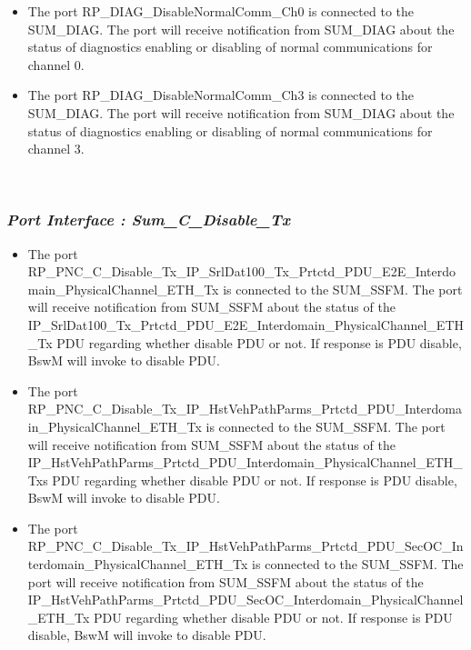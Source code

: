 \begin{itemize}
	\item The port RP_DIAG_DisableNormalComm_Ch0 is connected to the SUM_DIAG. The port will receive notification from SUM_DIAG about the status
    of diagnostics enabling or disabling of normal communications for channel 0.
\end{itemize}



\begin{itemize}
	\item The port RP_DIAG_DisableNormalComm_Ch3 is connected to the SUM_DIAG. The port will receive notification from SUM_DIAG about the status
    of diagnostics enabling or disabling of normal communications for channel 3.
\end{itemize}
\\
\subsubsection{\textit{Port Interface : Sum_C_Disable_Tx}}

\begin{itemize}
	\item The port RP_PNC_C_Disable_Tx_IP_SrlDat100_Tx_Prtctd_PDU_E2E_Interdomain_PhysicalChannel_ETH_Tx is connected to the SUM_SSFM. The port will receive notification from SUM_SSFM about the status of the IP_SrlDat100_Tx_Prtctd_PDU_E2E_Interdomain_PhysicalChannel_ETH_Tx PDU regarding whether disable PDU or not. If response is PDU disable, BswM will invoke to disable PDU.
\end{itemize}

\begin{itemize}
	\item The port RP_PNC_C_Disable_Tx_IP_HstVehPathParms_Prtctd_PDU_Interdomain_PhysicalChannel_ETH_Tx is connected to the SUM_SSFM. The port will receive notification from SUM_SSFM about the status of the IP_HstVehPathParms_Prtctd_PDU_Interdomain_PhysicalChannel_ETH_Txs PDU regarding whether disable PDU or not. If response is PDU disable, BswM will invoke to disable PDU.
\end{itemize}

\begin{itemize}
	\item The port RP_PNC_C_Disable_Tx_IP_HstVehPathParms_Prtctd_PDU_SecOC_Interdomain_PhysicalChannel_ETH_Tx is connected to the SUM_SSFM. The port will receive notification from SUM_SSFM about the status of the IP_HstVehPathParms_Prtctd_PDU_SecOC_Interdomain_PhysicalChannel_ETH_Tx PDU regarding whether disable PDU or not. If response is PDU disable, BswM will invoke to disable PDU.
\end{itemize}

